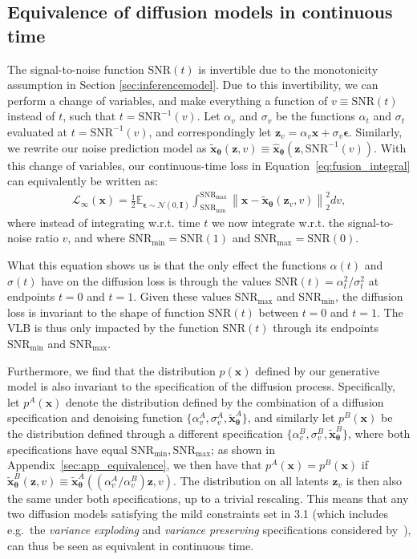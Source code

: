 \documentclass{article}
\def\Eqref#1{Equation~\ref{#1}}
\def\rvx{{\mathbf{x}}}
\def\rvz{{\mathbf{z}}}
\newcommand{\E}{\mathbb{E}}
\newcommand{\bT}{{\boldsymbol{\theta}}}
\newcommand{\bfI}{\mathbf{I}}
\newcommand{\bepsilon}{{\boldsymbol{\epsilon}}}
\newcommand{\linfty}{\mathcal{L}_{\infty}(\rvx)}
\newcommand{\snr}{\text{SNR}}
\newcommand{\snrmin}{\text{SNR}_{\text{min}}}
\newcommand{\snrmax}{\text{SNR}_{\text{max}}}
\begin{document}
\subsection{Equivalence of diffusion models in continuous time}
\label{sec:schedule_invariance}
The signal-to-noise function $\snr(t)$ is invertible due to the monotonicity assumption in Section \ref{sec:inferencemodel}. Due to this invertibility, we can perform a change of variables, and make everything a function of $v \equiv \snr(t)$ instead of $t$, such that $t = \snr^{-1}(v)$. Let $\alpha_v$ and $\sigma_v$ be the functions $\alpha_t$ and $\sigma_t$ evaluated at $t = \snr^{-1}(v)$, and correspondingly let $\rvz_v = \alpha_v \rvx + \sigma_v \bepsilon$. Similarly, we rewrite our noise prediction model as $\tilde{\rvx}_{\bT}(\rvz, v) \equiv \hat{\rvx}_{\bT}(\rvz, \snr^{-1}(v))$. With this change of variables, our continuous-time loss in \Eqref{eq:fusion_integral} can equivalently be written as:
\begin{align}
\linfty = \frac{1}{2}\E_{\bepsilon\sim\mathcal{N}(0,\bfI)} \int_{\snrmin}^{\snrmax} \left\rVert \rvx - \tilde{\rvx}_{\bT}(\rvz_v, v) \right\lVert_{2}^{2} dv,
\label{eq:elbo_v}
\end{align}
where instead of integrating w.r.t. time $t$ we now integrate w.r.t. the signal-to-noise ratio $v$, and where $\snr_\text{min}=\snr(1)$ and $\snr_\text{max}=\snr(0)$.

What this equation shows us is that the only effect the functions $\alpha(t)$ and $\sigma(t)$ have on the diffusion loss is through the values $\snr(t) = \alpha^{2}_t/\sigma^{2}_t$ at endpoints $t=0$ and $t=1$. Given these values $\snr_\text{max}$ and $\snr_\text{min}$, the diffusion loss is invariant to the shape of function $\snr(t)$ between $t=0$ and $t=1$. The VLB is thus only impacted by the function $\snr(t)$ through its endpoints $\snrmin$ and $\snrmax$. 

Furthermore, we find that the distribution $p(\rvx)$ defined by our generative model is also invariant to the specification of the diffusion process. Specifically, let $p^{A}(\rvx)$ denote the distribution defined by the combination of a diffusion specification and denoising function $\{\alpha^A_v, \sigma^A_v, \tilde{\rvx}^A_{\bT}\}$, and similarly let $p^{B}(\rvx)$ be the distribution defined through a different specification $\{\alpha^B_v, \sigma^B_v, \tilde{\rvx}^B_{\bT}\}$, where both specifications have equal $\snr_\text{min}, \snr_\text{max}$; as shown in Appendix~\ref{sec:app_equivalence}, we then have that $p^{A}(\rvx) = p^{B}(\rvx)$ if $\tilde{\rvx}^B_{\bT}(\rvz, v) \equiv \tilde{\rvx}^A_{\bT}((\alpha^A_v/\alpha^B_v)\rvz, v)$. The distribution on all latents $\rvz_v$ is then also the same under both specifications, up to a trivial rescaling. This means that any two diffusion models satisfying the mild constraints set in 3.1 (which includes e.g.\ the \emph{variance exploding} and \emph{variance preserving} specifications considered by~\cite{song2020score}), can thus be seen as equivalent in continuous time.
\end{document}
